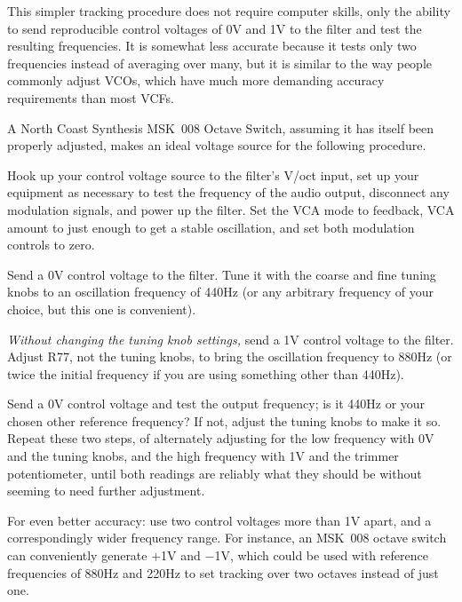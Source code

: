 This simpler tracking procedure does not require computer skills, only the
ability to send reproducible control voltages of 0V and 1V to the filter and
test the resulting frequencies.  It is somewhat less accurate because it
tests only two frequencies instead of averaging over many, but it is similar
to the way people commonly adjust VCOs, which have much more demanding
accuracy requirements than most VCFs.

A North Coast Synthesis MSK~008 Octave Switch, assuming it has itself been
properly adjusted, makes an ideal voltage source for the following
procedure.

Hook up your control voltage source to the filter's V/oct input, set up your
equipment as necessary to test the frequency of the audio output, disconnect
any modulation signals, and power up the filter.  Set the VCA mode to
feedback, VCA amount to just enough to get a stable oscillation, and set
both modulation controls to zero.

Send a 0V control voltage to the filter.  Tune it with the coarse and fine
tuning knobs to an oscillation frequency of 440Hz (or any arbitrary
frequency of your choice, but this one is convenient).

\emph{Without changing the tuning knob settings,} send a 1V control voltage
to the filter.  Adjust R77, not the tuning knobs, to bring the oscillation
frequency to 880Hz (or twice the initial frequency if you are using
something other than 440Hz).

Send a 0V control voltage and test the output frequency; is it 440Hz or your
chosen other reference frequency?  If not, adjust the tuning knobs to make
it so.  Repeat these two steps, of alternately adjusting for the low
frequency with 0V and the tuning knobs, and the high frequency with 1V and
the trimmer potentiometer, until both readings are reliably what they should
be without seeming to need further adjustment.

For even better accuracy:  use two control voltages more than 1V apart, and
a correspondingly wider frequency range.  For instance, an MSK~008 octave
switch can conveniently
generate $+$1V and $-$1V, which could be used with reference frequencies of
880Hz and 220Hz to set tracking over two octaves instead of just one.
